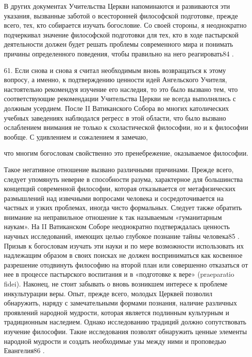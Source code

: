 \documentclass[a5paper,10pt]{article}
\begin{document}
В других документах Учительства Церкви напоминаются и развиваются эти указания,
вызванные заботой о всесторонней философской подготовке, прежде всего, тех, кто
собирается изучать богословие. Со своей стороны, я неоднократно подчеркивал
значение философской подготовки для тех, кто в ходе пастырской деятельности
должен будет решать проблемы современного мира и понимать причины определенного
поведения, чтобы правильно на него реагировать84 .

61. Если снова и снова я считал необходимым вновь возвращаться к этому вопросу,
а именно, к подтверждению ценности идей Ангельского Учителя, настоятельно
рекомендуя изучение его наследия, то это было вызвано тем, что соответствующие
рекомендации Учительства Церкви не всегда выполнялись с должным усердием. После
II Ватиканского Собора во многих католических учебных заведениях наблюдался
регресс в этой области, что было вызвано ослаблением внимания не только к
схоластической философии, но и к философии вообще. С удивлением и сожалением я
замечаю,

что многим богословам свойственно это пренебрежение, оказываемое философии.

Такое негативное отношение вызвано различными причинами. Прежде всего, следует
упомянуть неверие в способности разума, характерное для большинства концепций
современной философии, которая отказывается от метафизических размышлений над
извечными вопросами человека и сосредоточивается на частных и узких проблемах,
иногда чисто формальных. Следует также обратить внимание на неправильное
отношение к так называемым «гуманитарным наукам». На II Ватиканском Соборе
неоднократно подтверждалась ценность научных исследований, имеющих целью
глубокое познание тайны человека85 . Призыв к богословам изучать эти науки и по
мере возможности использовать их надлежащим образом в своих поисках не должен
восприниматься как косвенное разрешение отодвинуть философию на второй план или
совершенно отказаться от нее в процессе пастырского воспитания и в «подготовке
к вере» (praeparatio fidei). Наконец, не стоит забывать о вновь возникшем
интересе к проблеме инкультурации веры. Опыт, прежде всего, молодых Церквей
позволил обнаружить, наряду с замечательными формами познания, наличие
различных проявлений народной мудрости, которая является подлинным культурным и
традиционным наследием. Однако исследованию традиций должно сопутствовать
изучение философии. Такие исследования позволят обнаружить ценные элементы
народной мудрости и создать необходимые узы между ними и проповедью Евангелия86
.
\end{document}
